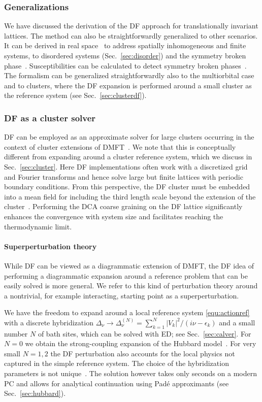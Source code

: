 \documentclass[rmp,aps,reprint,amsmath,amssymb,superscriptaddress,showpacs,nofootinbib]{revtex4-1}
\begin{document}
\subsubsection{Generalizations}
We have discussed the derivation of the DF approach for translationally invariant lattices. The method can also be straightforwardly generalized to other scenarios. It can be derived in real space~\cite{Takemori2016a} to address spatially inhomogeneous and finite systems, to disordered systems  (Sec.~\ref{sec:disorder}) and the  symmetry broken phase~\cite{Rubtsov2009}. Susceptibilities can be calculated to detect symmetry broken phases~\cite{Li2008,Brener08}. The formalism can be generalized straightforwardly also to the multiorbital case and to clusters, where the DF expansion is performed around a small cluster as the reference system (see Sec.~\ref{sec:clusterdf}).

\subsubsection{DF as a cluster solver}
DF can be employed as an approximate solver for large clusters occurring in the context of cluster extensions of DMFT~\cite{Maier2005}. We note that this is conceptually different from expanding around a cluster reference system, which we discuss in Sec.~\ref{sec:cluster}. Here DF implementations often work with a discretized grid and Fourier transforms and hence solve large but finite lattices with periodic boundary conditions. From this perspective, the DF cluster must be embedded into a mean field for including the third length scale beyond the extension of the cluster~\cite{Yang2013}. Performing the DCA coarse graining on the DF lattice significantly enhances the convergence with system size and facilitates reaching the thermodynamic limit.

\paragraph{Superperturbation theory}
\label{sec:spert}

While DF can be viewed as a diagrammatic extension of DMFT, the DF idea of performing a diagrammatic  expansion around a reference problem that can be easily solved is more general. We refer to this kind of perturbation theory around a nontrivial, for example interacting, starting point as a superperturbation.

We have the freedom to expand around a local reference system \eqref{equ:actionref} with a discrete hybridization $\Delta_{\nu}\to\Delta^{(N)}_{\nu} = \sum_{k=1}^{N}\lvert V_{k}\rvert^{2}/(i\nu - \epsilon_{k})$ and a small number $N$ of bath sites, which can be solved with ED; see Sec.~\ref{sec:calver}. For $N=0$ we obtain the strong-coupling expansion of the Hubbard model~\cite{Pairault1998,Pairault2000}. For very small $N=1,2$ the DF perturbation also accounts for the local physics not captured in the simple reference system. The choice of the hybridization parameters is not unique~\cite{Jung2010}. The solution however takes only seconds on a modern PC and allows for analytical continuation using Pad\'e approximants (see Sec.~\ref{sec:hubbard}). 
\end{document}
